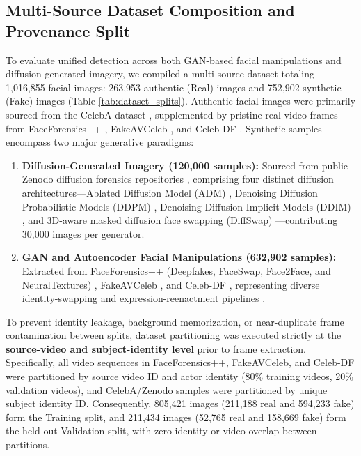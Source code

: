 \documentclass[fleqn,10pt]{wlscirep}
\begin{document}
\subsection*{Multi-Source Dataset Composition and Provenance Split}
To evaluate unified detection across both GAN-based facial manipulations and diffusion-generated imagery, we compiled a multi-source dataset totaling 1,016,855 facial images: 263,953 authentic (Real) images and 752,902 synthetic (Fake) images (Table \ref{tab:dataset_splits}). Authentic facial images were primarily sourced from the CelebA dataset \cite{ref36}, supplemented by pristine real video frames from FaceForensics++ \cite{ref12}, FakeAVCeleb \cite{ref11}, and Celeb-DF \cite{ref37}. Synthetic samples encompass two major generative paradigms:
\begin{enumerate}
    \item \textbf{Diffusion-Generated Imagery (120,000 samples):} Sourced from public Zenodo diffusion forensics repositories \cite{ref9, ref10, ref21}, comprising four distinct diffusion architectures---Ablated Diffusion Model (ADM) \cite{ref3}, Denoising Diffusion Probabilistic Models (DDPM) \cite{ref1}, Denoising Diffusion Implicit Models (DDIM) \cite{ref2}, and 3D-aware masked diffusion face swapping (DiffSwap) \cite{ref16}---contributing 30,000 images per generator.
    \item \textbf{GAN and Autoencoder Facial Manipulations (632,902 samples):} Extracted from FaceForensics++ (Deepfakes, FaceSwap, Face2Face, and NeuralTextures) \cite{ref12, ref18}, FakeAVCeleb \cite{ref11}, and Celeb-DF \cite{ref37}, representing diverse identity-swapping and expression-reenactment pipelines \cite{ref13, ref17, ref19, ref20, ref22, ref23}.
\end{enumerate}

To prevent identity leakage, background memorization, or near-duplicate frame contamination between splits, dataset partitioning was executed strictly at the \textbf{source-video and subject-identity level} prior to frame extraction. Specifically, all video sequences in FaceForensics++, FakeAVCeleb, and Celeb-DF were partitioned by source video ID and actor identity (80\% training videos, 20\% validation videos), and CelebA/Zenodo samples were partitioned by unique subject identity ID. Consequently, 805,421 images (211,188 real and 594,233 fake) form the Training split, and 211,434 images (52,765 real and 158,669 fake) form the held-out Validation split, with zero identity or video overlap between partitions.
\end{document}
